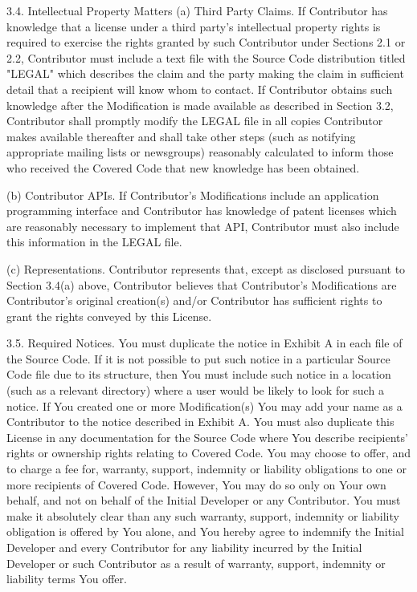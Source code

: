 \begin{DoxyCode}
     3.4. Intellectual Property Matters
          (a) Third Party Claims.
          If Contributor has knowledge that a license under a third party's
          intellectual property rights is required to exercise the rights
          granted by such Contributor under Sections 2.1 or 2.2,
          Contributor must include a text file with the Source Code
          distribution titled "LEGAL" which describes the claim and the
          party making the claim in sufficient detail that a recipient will
          know whom to contact. If Contributor obtains such knowledge after
          the Modification is made available as described in Section 3.2,
          Contributor shall promptly modify the LEGAL file in all copies
          Contributor makes available thereafter and shall take other steps
          (such as notifying appropriate mailing lists or newsgroups)
          reasonably calculated to inform those who received the Covered
          Code that new knowledge has been obtained.

          (b) Contributor APIs.
          If Contributor's Modifications include an application programming
          interface and Contributor has knowledge of patent licenses which
          are reasonably necessary to implement that API, Contributor must
          also include this information in the LEGAL file.

               (c)    Representations.
          Contributor represents that, except as disclosed pursuant to
          Section 3.4(a) above, Contributor believes that Contributor's
          Modifications are Contributor's original creation(s) and/or
          Contributor has sufficient rights to grant the rights conveyed by
          this License.

     3.5. Required Notices.
     You must duplicate the notice in Exhibit A in each file of the Source
     Code.  If it is not possible to put such notice in a particular Source
     Code file due to its structure, then You must include such notice in a
     location (such as a relevant directory) where a user would be likely
     to look for such a notice.  If You created one or more Modification(s)
     You may add your name as a Contributor to the notice described in
     Exhibit A.  You must also duplicate this License in any documentation
     for the Source Code where You describe recipients' rights or ownership
     rights relating to Covered Code.  You may choose to offer, and to
     charge a fee for, warranty, support, indemnity or liability
     obligations to one or more recipients of Covered Code. However, You
     may do so only on Your own behalf, and not on behalf of the Initial
     Developer or any Contributor. You must make it absolutely clear than
     any such warranty, support, indemnity or liability obligation is
     offered by You alone, and You hereby agree to indemnify the Initial
     Developer and every Contributor for any liability incurred by the
     Initial Developer or such Contributor as a result of warranty,
     support, indemnity or liability terms You offer.


\end{DoxyCode}
